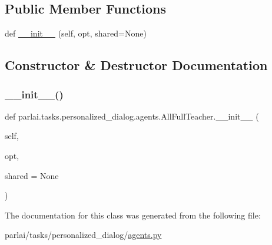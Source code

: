 \subsection*{Public Member Functions}
\begin{DoxyCompactItemize}
\item 
def \hyperlink{classparlai_1_1tasks_1_1personalized__dialog_1_1agents_1_1AllFullTeacher_a0ff199f278a48cb4c7979503ef501916}{\+\_\+\+\_\+init\+\_\+\+\_\+} (self, opt, shared=None)
\end{DoxyCompactItemize}


\subsection{Constructor \& Destructor Documentation}
\mbox{\label{classparlai_1_1tasks_1_1personalized__dialog_1_1agents_1_1AllFullTeacher_a0ff199f278a48cb4c7979503ef501916}} 
\subsubsection{\texorpdfstring{\+\_\+\+\_\+init\+\_\+\+\_\+()}{\_\_init\_\_()}}
{\footnotesize\ttfamily def parlai.\+tasks.\+personalized\+\_\+dialog.\+agents.\+All\+Full\+Teacher.\+\_\+\+\_\+init\+\_\+\+\_\+ (\begin{DoxyParamCaption}\item[{}]{self,  }\item[{}]{opt,  }\item[{}]{shared = {\ttfamily None} }\end{DoxyParamCaption})}



The documentation for this class was generated from the following file\+:\begin{DoxyCompactItemize}
\item 
parlai/tasks/personalized\+\_\+dialog/\hyperlink{parlai_2tasks_2personalized__dialog_2agents_8py}{agents.\+py}\end{DoxyCompactItemize}
